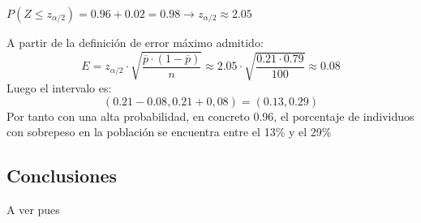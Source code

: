$P\left(Z \leqslant z_{\alpha / 2} \right)= 0.96 + 0.02 = 0.98 \to z_{\alpha / 2} \approx 2.05$
 
A partir de la definición de error máximo admitido:
$$E=z_{\alpha / 2}\cdot \sqrt{\frac{\overline{p}\cdot\left(1-\overline{p} \right)}{n}}\approx 2.05 \cdot \sqrt{\frac{0.21\cdot 0.79}{100}}\approx 0.08$$
Luego el intervalo es: \\ 
$$\left( 0.21 - 0.08 , 0.21 + 0,08 \right) = \left(0.13, 0.29 \right)
$$
Por tanto con una alta probabilidad, en concreto 0.96, el porcentaje de individuos con sobrepeso en la población se encuentra entre el 13\% y el 29\% 

\subsection{Conclusiones} A ver pues





